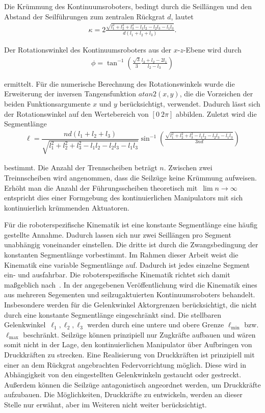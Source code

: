 Die Krümmung des Kontinuumsroboters, bedingt durch die Seillängen und den Abstand der Seilführungen zum zentralen Rückgrat $d$, lautet
\begin{align}
\kappa = 2\frac{\sqrt{l_1^2+l_2^2+l_3^2-l_1l_2-l_2l_3-l_1l_3}}{d(l_1+l_2+l_3)}.
\label{eq:kappa}
\end{align}

Der Rotationswinkel des Kontinuumsroboters aus der $x$-$z$-Ebene wird durch
\begin{align}
\phi = \tan^{-1}\left(\frac{\sqrt{3}}{3} \frac{l_3+l_2-2l_1}{l_2-l_3} \right)
\label{eq:phi}
\end{align}

ermittelt. Für die numerische Berechnung des Rotationswinkels wurde die Erweiterung der inversen Tangensfunktion $atan2(x, y)$, die die Vorzeichen der beiden Funktionsargumente $x$ und $y$ berücksichtigt, verwendet. Dadurch lässt sich der Rotationswinkel auf den Wertebereich von $[0~2\pi]$ abbilden. Zuletzt wird die Segmentlänge 
\begin{align}
\ell = \dfrac{nd(l_1+l_2+l_3)}{\sqrt{l_1^2+l_2^2+l_3^2-l_1l_2-l_2l_3-l_1l_3}} 
\sin^{-1}\left( \frac{\sqrt{l_1^2+l_2^2+l_3^2-l_1l_2-l_2l_3-l_1l_3}}{3nd} \right)
\label{eq:ell}
\end{align}

bestimmt. Die Anzahl der Trennscheiben beträgt $n$. Zwischen zwei Treinnscheiben wird angenommen, dass die Seilzüge keine Krümmung aufweisen. Erhöht man die Anzahl der Führungsscheiben theoretisch mit~$\lim n\to \infty$ entspricht dies einer Formgebung des kontinuierlichen Manipulators mit sich kontinuierlich krümmenden Aktuatoren.

Für die roboterspezifische Kinematik ist eine konstante Segmentlänge eine häufig gestellte Annahme. Dadurch lassen sich nur zwei Seillängen pro Segment unabhängig voneinander einstellen. Die dritte ist durch die Zwangsbedingung der konstanten Segmentlänge vorbestimmt. 
Im Rahmen dieser Arbeit weist die Kinematik eine variable Segmentlänge auf. Dadurch ist jedes einzelne Segment ein- und ausfahrbar. Die roboterspezifische Kinematik richtet sich damit maßgeblich nach~\cite{JW06a}. In der angegebenen Veröffentlichung wird die Kinematik eines aus mehreren Segementen und seilzugaktuierten Kontinuumsroboters behandelt. Insbesondere werden für die Gelenkwinkel Aktorgrenzen berücksichtigt, die nicht durch eine konstante Segmentlänge eingeschränkt sind. Die stellbaren \mbox{Gelenkwinkel $\ell_1, \ell_2, \ell_3$} werden durch eine untere und obere Grenze $\ell_{\mathrm{min}}$ bzw. $\ell_{\mathrm{max}}$ beschränkt. Seilzüge können prinzipiell nur Zugkräfte aufbauen und wären somit nicht in der Lage, den kontinuierlichen Manipulator über Aufbringen von Druckkräften zu strecken. Eine Realisierung von Druckkräften ist prinzipiell mit einer an dem Rückgrat angebrachten Federvorrichtung möglich. Diese wird in Abhängigkeit von den eingestellten Gelenkwinkeln gestaucht oder gestreckt. Außerdem können die Seilzüge antagonistisch angeordnet werden, um Druckkräfte aufzubauen. Die Möglichkeiten, Druckkräfte zu entwickeln, werden an dieser Stelle nur erwähnt, aber im Weiteren nicht weiter berücksichtigt. \newline

